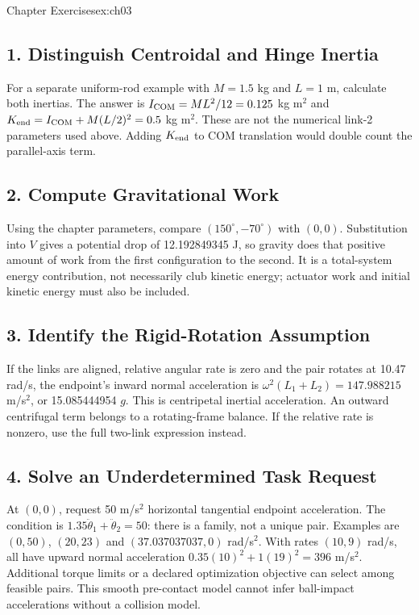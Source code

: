 \begin{exercises}{Chapter Exercises}{ex:ch03}
\subsection*{1. Distinguish Centroidal and Hinge Inertia}
For a separate uniform-rod example with $M=1.5$ kg and $L=1$ m, calculate both inertias. The answer is $I_{\rm COM}=ML^2/12=0.125$ kg m$^2$ and $K_{\rm end}=I_{\rm COM}+M(L/2)^2=0.5$ kg m$^2$. These are not the numerical link-2 parameters used above. Adding $K_{\rm end}$ to COM translation would double count the parallel-axis term.

\subsection*{2. Compute Gravitational Work}
Using the chapter parameters, compare $(150^\circ,-70^\circ)$ with $(0,0)$. Substitution into $V$ gives a potential drop of 12.192849345 J, so gravity does that positive amount of work from the first configuration to the second. It is a total-system energy contribution, not necessarily club kinetic energy; actuator work and initial kinetic energy must also be included.

\subsection*{3. Identify the Rigid-Rotation Assumption}
If the links are aligned, relative angular rate is zero and the pair rotates at 10.47 rad/s, the endpoint's inward normal acceleration is $\omega^2(L_1+L_2)=147.988215$ m/s$^2$, or 15.085444954 $g$. This is centripetal inertial acceleration. An outward centrifugal term belongs to a rotating-frame balance. If the relative rate is nonzero, use the full two-link expression instead.

\subsection*{4. Solve an Underdetermined Task Request}
At $(0,0)$, request 50 m/s$^2$ horizontal tangential endpoint acceleration. The condition is $1.35\ddot\theta_1+\ddot\theta_2=50$: there is a family, not a unique pair. Examples are $(0,50)$, $(20,23)$ and $(37.037037037,0)$ rad/s$^2$. With rates $(10,9)$ rad/s, all have upward normal acceleration $0.35(10)^2+1(19)^2=396$ m/s$^2$. Additional torque limits or a declared optimization objective can select among feasible pairs. This smooth pre-contact model cannot infer ball-impact accelerations without a collision model.


\end{exercises}
